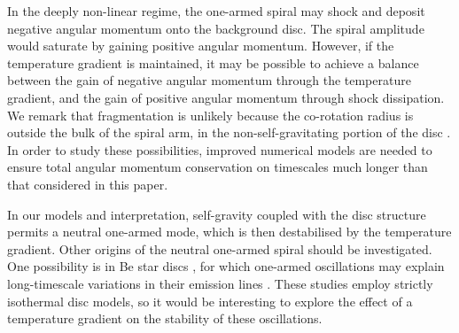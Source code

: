 In the deeply non-linear regime, the one-armed spiral may 
shock and deposit negative angular momentum onto
the background disc. The spiral amplitude would saturate by gaining
positive angular momentum. However, if the temperature gradient is
maintained, it may be possible to achieve a balance between the gain
of negative angular momentum through the temperature gradient, and the
gain of positive angular momentum through shock dissipation. We remark  
that fragmentation is unlikely because the co-rotation radius 
is outside the bulk of the spiral arm, in the non-self-gravitating
portion of the disc \citep{durisen08}. In order
to study these possibilities, improved numerical models are needed to
ensure total angular momentum conservation on timescales much longer
than that considered in this paper. 


In our models and interpretation, self-gravity coupled with the disc 
structure permits a neutral one-armed mode, which is then
destabilised by the temperature gradient. Other origins of the neutral
one-armed spiral should be investigated. One possibility is in Be star discs
\citep{rivinius13}, for which 
one-armed oscillations may explain long-timescale variations in their
emission lines \citep[see e.g.][and references
therein]{okasaki97,papaloizou06c,ogilvie08}. These studies employ
strictly isothermal disc models, so it would be interesting to explore
the effect of a temperature gradient on the stability of these
oscillations. 



